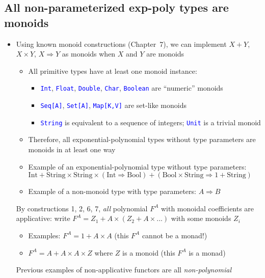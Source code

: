 \subsection{All non-parameterized exp-poly types are monoids}
\begin{itemize}
\item \vspace{-0.1cm}Using known monoid constructions (Chapter\ 7), we
can implement $X+Y$, $X\times Y$, $X\Rightarrow Y$ as monoids when
$X$ and $Y$ are monoids
\begin{itemize}
\item All primitive types have at least one monoid instance:
\begin{itemize}
\item \texttt{\textcolor{blue}{\footnotesize{}Int}}, \texttt{\textcolor{blue}{\footnotesize{}Float}},
\texttt{\textcolor{blue}{\footnotesize{}Double}}, \texttt{\textcolor{blue}{\footnotesize{}Char}},
\texttt{\textcolor{blue}{\footnotesize{}Boolean}} are ``numeric''
monoids
\item \texttt{\textcolor{blue}{\footnotesize{}Seq{[}A{]}}}, \texttt{\textcolor{blue}{\footnotesize{}Set{[}A{]}}},
\texttt{\textcolor{blue}{\footnotesize{}Map{[}K,V{]}}} are set-like
monoids
\item \texttt{\textcolor{blue}{\footnotesize{}String}} is equivalent to
a sequence of integers; \texttt{\textcolor{blue}{\footnotesize{}Unit}}
is a trivial monoid
\end{itemize}
\item Therefore, all exponential-polynomial types without type parameters
are monoids in at least one way
\item Example of an exponential-polynomial type without type parameters:
{\footnotesize{}$\text{Int}+\text{String}\times\text{String}\times\left(\text{Int}\Rightarrow\text{Bool}\right)+\left(\text{Bool}\times\text{String}\Rightarrow1+\text{String}\right)$} 
\item Example of a non-monoid type with type parameters: $A\Rightarrow B$
\end{itemize}
By constructions 1, 2, 6, 7, \emph{all} polynomial $F^{A}$ with monoidal
coefficients are applicative: write $F^{A}=Z_{1}+A\times\left(Z_{2}+A\times...\right)$
with some monoids $Z_{i}$
\begin{itemize}
\item Examples: $F^{A}=1+A\times A$ (this $F^{A}$ cannot be a monad!)
\item $F^{A}=A+A\times A\times Z$ where $Z$ is a monoid (this $F^{A}$
is a monad)
\end{itemize}
Previous examples of non-applicative functors are all \emph{non-polynomial}
\end{itemize}


